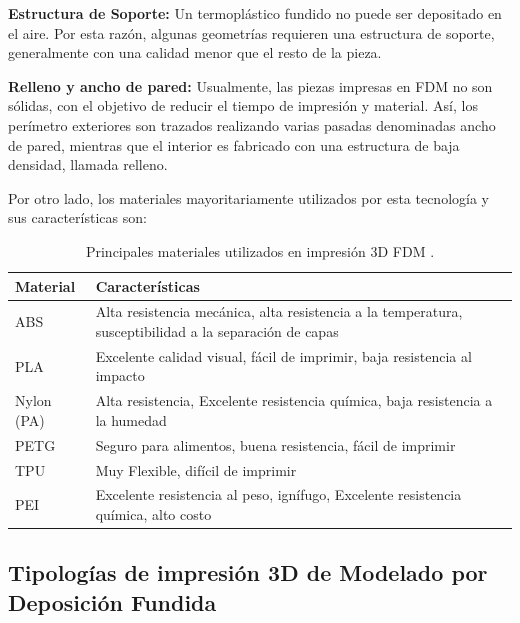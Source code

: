 \begin{description}
\item \textbf{Estructura de Soporte:} Un termoplástico fundido no puede ser depositado en el aire. Por esta razón, algunas geometrías requieren una estructura de soporte, generalmente con una calidad menor que el resto de la pieza.
\end{description}

\begin{description}
\item \textbf{Relleno y ancho de pared:} Usualmente, las piezas impresas en FDM no son sólidas, con el objetivo de reducir el tiempo de impresión y material. Así, los perímetro exteriores son trazados realizando varias pasadas denominadas ancho de pared, mientras que el interior es fabricado con una estructura de baja densidad, llamada relleno.
\end{description}

\clearpage

Por otro lado, los materiales mayoritariamente utilizados por esta tecnología y sus características son: 

\begin{table}[H]
\centering
\begin{tabular}{|p{2cm}|p{8cm}|}
\hline
Material & Características \\
\hline
ABS & Alta resistencia mecánica, alta resistencia a la temperatura, susceptibilidad a la separación de capas\\
\hline
PLA & Excelente calidad visual, fácil de imprimir, baja resistencia al impacto\\
\hline
Nylon (PA) & Alta resistencia, Excelente resistencia química, baja resistencia a la humedad\\
\hline
PETG & Seguro para alimentos, buena resistencia, fácil de imprimir\\
\hline
TPU & Muy Flexible, difícil de imprimir\\
\hline
PEI & Excelente resistencia al peso, ignífugo, Excelente resistencia química, alto costo\\
\hline
\end{tabular}
\caption{Principales materiales utilizados en impresión 3D FDM \parencite{bournias2017}.}
\end{table}

\subsection{Tipologías de impresión 3D de Modelado por Deposición Fundida}

